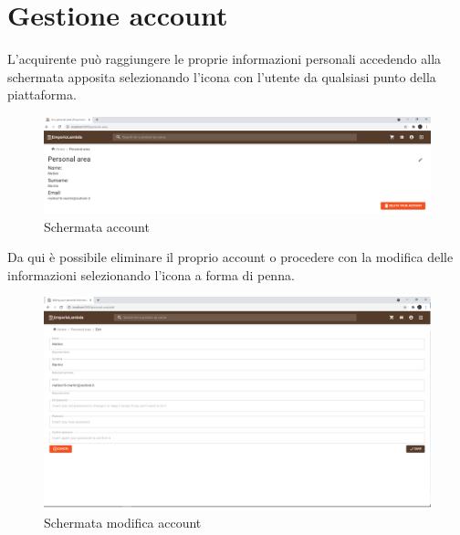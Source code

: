 \section{Gestione account}\label{ModificaProf}
L'acquirente può raggiungere le proprie informazioni personali accedendo alla schermata apposita selezionando l'icona con l'utente da qualsiasi punto della piattaforma.
\begin{figure}[H]
	\centering
	\includegraphics[scale=0.3]{Immagini/Acquirente/Personal Area.png}
	\caption{Schermata account}
	\label{fig:Account}
\end{figure}
Da qui è possibile eliminare il proprio account o procedere con la modifica delle informazioni selezionando l'icona a forma di penna.
\begin{figure}[H]
	\centering
	\includegraphics[scale=0.3]{Immagini/Acquirente/Change Password.png}
	\caption{Schermata modifica account}
	\label{fig:ModificaAccount}
\end{figure}
